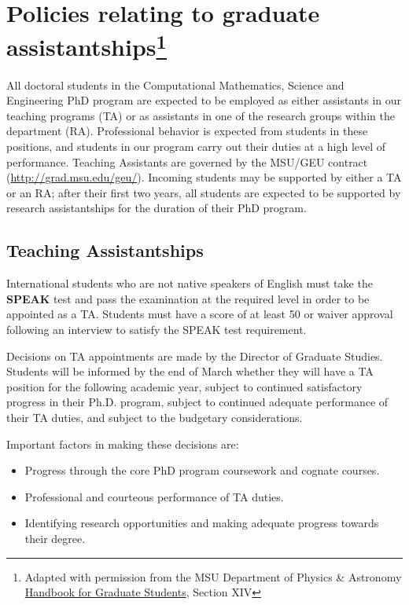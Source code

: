\section[Policies relating to graduate assistantships]{Policies
relating to graduate assistantships\footnote{Adapted with permission
from the MSU Department of Physics \& Astronomy
\href{https://www.pa.msu.edu/grad/GradHandbook_Aug2015.pdf}{Handbook
for Graduate Students}, Section XIV}}

All doctoral students in the Computational
Mathematics, Science and Engineering PhD program are expected to be
employed as either assistants in our teaching programs (TA) or as
assistants in one of the research groups within the department (RA).
Professional behavior is expected from students in these positions, and
students in our program carry out their duties at a high level of
performance.  Teaching Assistants are governed by the MSU/GEU contract
(\url{http://grad.msu.edu/geu/}).  Incoming students may be supported
by either a TA or an RA; after their first two years, all students are
expected to be supported by research assistantships for the duration
of their PhD program.

\subsection{Teaching Assistantships}

International students who are not native speakers of English must
take the \textbf{SPEAK} test and pass the examination at the required
level in order to be appointed as a TA.  Students must have a score of
at least 50 or waiver approval following an interview to satisfy the
SPEAK test requirement.

Decisions on TA appointments are made by the Director of Graduate
Studies.  Students will be informed by the end of March whether they
will have a TA position for the following academic year, subject to
continued satisfactory progress in their Ph.D. program, subject to
continued adequate performance of their TA duties, and subject to the
budgetary considerations.

Important factors in making these decisions are:

\begin{itemize}
\item Progress through the core PhD program coursework and 
cognate courses.
\item Professional and courteous performance of TA duties.
\item Identifying research opportunities and making adequate progress
towards their degree.
\end{itemize}

